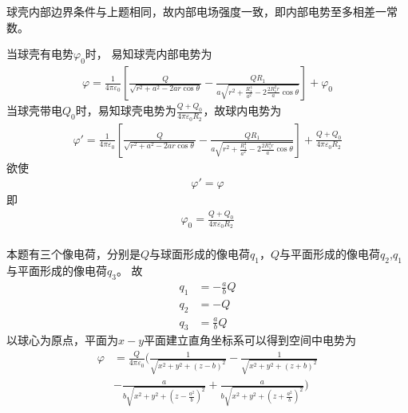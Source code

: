\documentclass{phyasgn}
\begin{document}
\begin{sol}[3]
  球壳内部边界条件与上题相同，故内部电场强度一致，即内部电势至多相差一常数。

  当球壳有电势$\varphi_0$时，
  易知球壳内部电势为
  \begin{align*}
    \varphi=\frac{1}{4\pi\varepsilon_0}\left[\frac{Q}{\sqrt{r^2+a^2-2ar\cos\theta}}-\frac{QR_1}{a\sqrt{r^2+\frac{R_1^4}{a^2}-2\frac{2R_1^2r}{a}\cos\theta}}\right]+\varphi_0
  \end{align*}
  当球壳带电$Q_0$时，易知球壳电势为$\frac{Q+Q_0}{4\pi\varepsilon_0R_2}$，故球内电势为
  \begin{align*}
    \varphi'=\frac{1}{4\pi\varepsilon_0}\left[\frac{Q}{\sqrt{r^2+a^2-2ar\cos\theta}}-\frac{QR_1}{a\sqrt{r^2+\frac{R_1^4}{a^2}-2\frac{2R_1^2r}{a}\cos\theta}}\right]+\frac{Q+Q_0}{4\pi\varepsilon_0R_2}
  \end{align*}
  欲使
  \begin{align*}
    \varphi'=\varphi
  \end{align*}
  即
  \begin{align*}
    \varphi_0=\frac{Q+Q_0}{4\pi\varepsilon_0R_2}\\
  \end{align*}
\end{sol}

\begin{sol}[4]
  本题有三个像电荷，分别是$Q$与球面形成的像电荷$q_1$，$Q$与平面形成的像电荷$q_2$,$q_1$与平面形成的像电荷$q_3$。
  故
  \begin{align*}
    q_1&=-\frac{a}{b}Q\\
    q_2&=-Q\\
    q_3&=\frac{a}{b}Q
  \end{align*}
  以球心为原点，平面为$x-y$平面建立直角坐标系可以得到空间中电势为
  \begin{align*}
    \varphi&=\frac{Q}{4\pi\varepsilon_0}\Bigg(\frac{1}{\sqrt{x^2+y^2+(z-b)^2}}-\frac{1}{\sqrt{x^2+y^2+(z+b)^2}}\\
    &-\frac{a}{b\sqrt{x^2+y^2+\left(z-\frac{a^2}{b}\right)^2}}+\frac{a}{b\sqrt{x^2+y^2+\left(z+\frac{a^2}{b}\right)^2}}\Bigg)
  \end{align*}
\end{sol}
\end{document}
